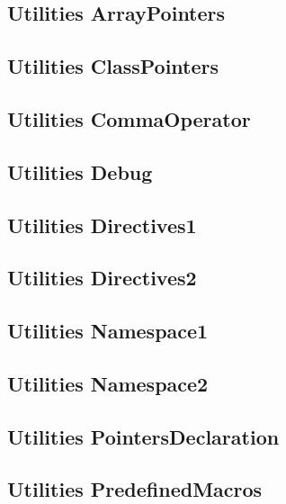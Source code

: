 \subsection{Utilities ArrayPointers}
\raggedbottom
\hrulefill
\subsection{Utilities ClassPointers}
\raggedbottom
\hrulefill
\subsection{Utilities CommaOperator}
\raggedbottom
\hrulefill
\subsection{Utilities Debug}
\raggedbottom
\hrulefill
\subsection{Utilities Directives1}
\raggedbottom
\hrulefill
\subsection{Utilities Directives2}
\raggedbottom
\hrulefill
\subsection{Utilities Namespace1}
\raggedbottom
\hrulefill
\subsection{Utilities Namespace2}
\raggedbottom
\hrulefill
\subsection{Utilities PointersDeclaration}
\raggedbottom
\hrulefill
\subsection{Utilities PredefinedMacros}
\raggedbottom
\hrulefill
